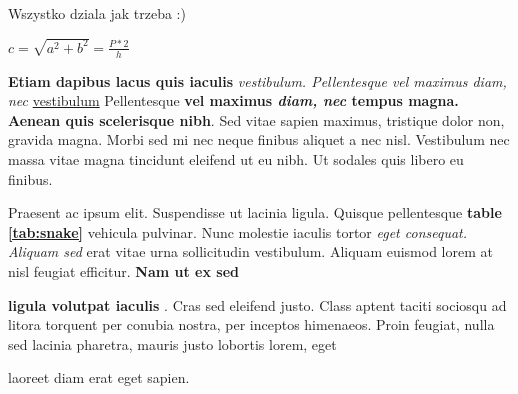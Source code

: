 Wszystko dziala jak trzeba :)
\vspace{6pt}

$c=\sqrt{a^2+b^2}=\frac{P*2}{h}$
\vspace{10pt}

\textbf{Etiam dapibus lacus quis iaculis} \textit{vestibulum. Pellentesque vel maximus diam, nec } \underline{vestibulum} Pellentesque \textbf{vel maximus \emph{diam, nec} tempus magna. Aenean quis scelerisque nibh}. Sed vitae sapien maximus, tristique dolor non, gravida magna. Morbi sed mi nec neque finibus aliquet a nec nisl. Vestibulum nec massa vitae magna tincidunt eleifend ut eu nibh. Ut sodales quis libero eu finibus.

\begin{flushright} Praesent ac ipsum elit. Suspendisse ut lacinia ligula. Quisque pellentesque \textbf{table \ref{tab:snake}} vehicula pulvinar. Nunc molestie iaculis tortor \textit{eget consequat. Aliquam sed}  erat vitae urna sollicitudin vestibulum. Aliquam euismod lorem at nisl feugiat efficitur. \textbf{Nam ut ex sed}  \end{flushright} \begin{center} \textbf{ligula volutpat iaculis} . Cras sed eleifend justo. Class aptent taciti sociosqu ad litora torquent per conubia nostra, per inceptos himenaeos. Proin feugiat, nulla sed lacinia pharetra,  mauris justo lobortis lorem, eget \end{center} laoreet diam erat eget sapien.
